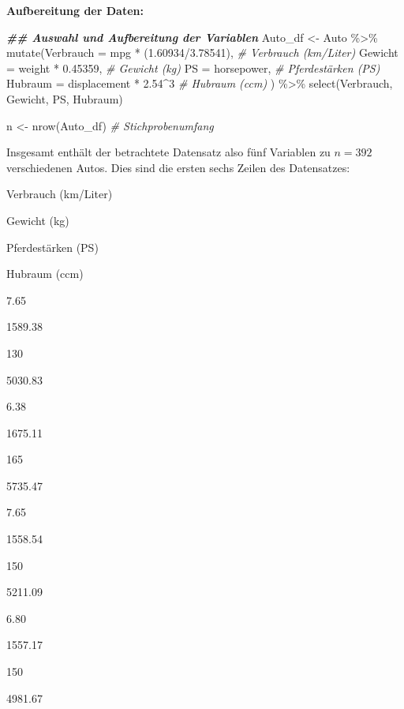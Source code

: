 \documentclass[
  ngerman,
]{book}
\newenvironment{Shaded}{\begin{snugshade}}{\end{snugshade}}
\newcommand{\AttributeTok}[1]{\textcolor[rgb]{0.77,0.63,0.00}{#1}}
\newcommand{\CommentTok}[1]{\textcolor[rgb]{0.56,0.35,0.01}{\textit{#1}}}
\newcommand{\DecValTok}[1]{\textcolor[rgb]{0.00,0.00,0.81}{#1}}
\newcommand{\DocumentationTok}[1]{\textcolor[rgb]{0.56,0.35,0.01}{\textbf{\textit{#1}}}}
\newcommand{\FloatTok}[1]{\textcolor[rgb]{0.00,0.00,0.81}{#1}}
\newcommand{\FunctionTok}[1]{\textcolor[rgb]{0.00,0.00,0.00}{#1}}
\newcommand{\NormalTok}[1]{#1}
\newcommand{\OtherTok}[1]{\textcolor[rgb]{0.56,0.35,0.01}{#1}}
\newcommand{\SpecialCharTok}[1]{\textcolor[rgb]{0.00,0.00,0.00}{#1}}
\begin{document}
\textbf{Aufbereitung der Daten:}

\begin{Shaded}
\begin{Highlighting}[]
\DocumentationTok{\#\# Auswahl und Aufbereitung der Variablen }
\NormalTok{Auto\_df }\OtherTok{\textless{}{-}}\NormalTok{ Auto }\SpecialCharTok{\%\textgreater{}\%} 
  \FunctionTok{mutate}\NormalTok{(}\AttributeTok{Verbrauch =}\NormalTok{ mpg }\SpecialCharTok{*}\NormalTok{ (}\FloatTok{1.60934}\SpecialCharTok{/}\FloatTok{3.78541}\NormalTok{), }\CommentTok{\# Verbrauch (km/Liter)}
         \AttributeTok{Gewicht   =}\NormalTok{ weight }\SpecialCharTok{*} \FloatTok{0.45359}\NormalTok{,        }\CommentTok{\# Gewicht (kg)}
         \AttributeTok{PS        =}\NormalTok{ horsepower,              }\CommentTok{\# Pferdestärken (PS)}
         \AttributeTok{Hubraum   =}\NormalTok{ displacement }\SpecialCharTok{*} \FloatTok{2.54}\SpecialCharTok{\^{}}\DecValTok{3}    \CommentTok{\# Hubraum (ccm)}
\NormalTok{         ) }\SpecialCharTok{\%\textgreater{}\%}   
 \FunctionTok{select}\NormalTok{(Verbrauch, Gewicht, PS, Hubraum) }

\NormalTok{n }\OtherTok{\textless{}{-}} \FunctionTok{nrow}\NormalTok{(Auto\_df) }\CommentTok{\# Stichprobenumfang }
\end{Highlighting}
\end{Shaded}

Insgesamt enthält der betrachtete Datensatz also fünf Variablen zu \(n=392\) verschiedenen Autos. Dies sind die ersten sechs Zeilen des Datensatzes:

Verbrauch (km/Liter)

Gewicht (kg)

Pferdestärken (PS)

Hubraum (ccm)

7.65

1589.38

130

5030.83

6.38

1675.11

165

5735.47

7.65

1558.54

150

5211.09

6.80

1557.17

150

4981.67
\end{document}
